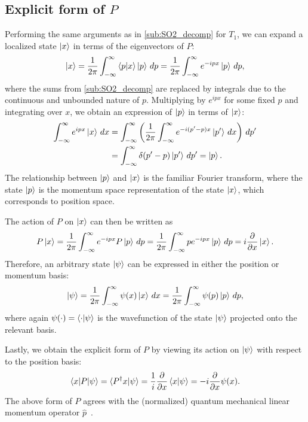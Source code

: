 \subsection{Explicit form of $P$}\label{sub:explicit_P}

Performing the same arguments as in \cref{sub:SO2_decomp} for $T_1$, we can expand a localized state $\ket{x}$  in terms of the eigenvectors of $P$:
\begin{align*}
    \ket{x} = \frac{1}{2\pi}\int_{-\infty}^{\infty} \braket{p|x}\ket{p} \,dp = \frac{1}{2\pi}\int_{-\infty}^{\infty} e^{-ipx}\ket{p} \,dp,
\end{align*}
where the sums from \cref{sub:SO2_decomp} are replaced by integrals due to the continuous and unbounded nature of $p$. Multiplying by $e^{ipx}$ for some fixed $p$ and integrating over $x$, we obtain an expression of $\ket{p}$ in terms of $\ket{x}$:
\begin{align*}
    \int_{-\infty}^{\infty} e^{ipx}\ket{x} \,dx
        &= \int_{-\infty}^{\infty} \left(\frac{1}{2\pi} \int_{-\infty}^{\infty} e^{-i(p'-p)x}\ket{p'} \,dx \right)\,dp' \\
        &= \int_{-\infty}^{\infty} \delta(p'-p) \ket{p'} \,dp' = \ket{p}.
\end{align*}
The relationship between $\ket{p}$ and $\ket{x}$ is the familiar Fourier transform, where the state $\ket{p}$ is the momentum space representation of the state $\ket{x}$, which corresponds to position space.

The action of $P$ on $\ket{x}$ can then be written as
\begin{align*}
    P\ket{x} = \frac{1}{2\pi}\int_{-\infty}^{\infty} e^{-ipx}P\ket{p} \,dp = \frac{1}{2\pi}\int_{-\infty}^{\infty} p e^{-ipx}\ket{p} \,dp = i\frac{\partial}{\partial x}\ket{x}.
\end{align*}
Therefore, an arbitrary state $\ket{\psi}$ can be expressed in either the position or momentum basis:
\begin{align*}
    \ket{\psi} = \frac{1}{2\pi}\int_{-\infty}^{\infty} \psi(x)\ket{x} \,dx = \frac{1}{2\pi}\int_{-\infty}^{\infty} \psi(p)\ket{p} \,dp,
\end{align*}
where again $\psi(\cdot) = \braket{\cdot|\psi}$ is the wavefunction of the state $\ket{\psi}$ projected onto the relevant basis.

Lastly, we obtain the explicit form of $P$ by viewing its action on $\ket{\psi}$ with respect to the position basis:
\begin{align*}
    \braket{x|P|\psi} = \braket{P^\dagger x|\psi} = \frac{1}{i}\frac{\partial}{\partial x}\braket{x|\psi} = -i\frac{\partial}{\partial x}\psi(x).
\end{align*}
The above form of $P$ agrees with the (normalized) quantum mechanical linear momentum operator $\hat{p}$~\cite{Hall2013,Griffiths2018}.

